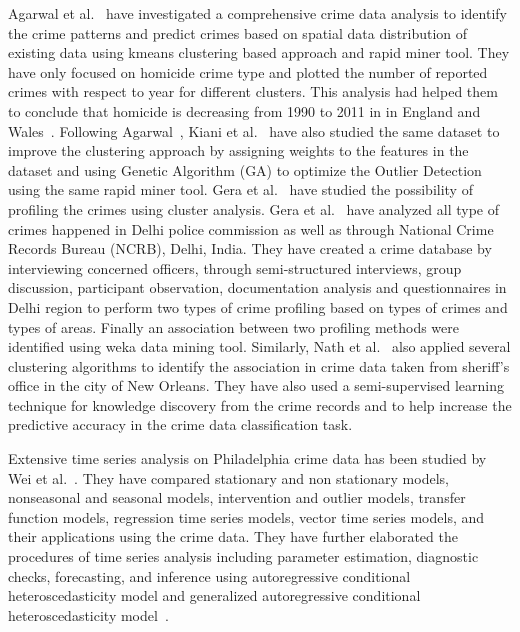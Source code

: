 Agarwal et al.~\cite{hid-sp18-409-agarwal2013crime} have investigated
a comprehensive crime data analysis to identify the crime patterns and
predict crimes based on spatial data distribution of existing data
using kmeans clustering based approach and rapid miner tool. They have
only focused on homicide crime type and plotted the number of reported
crimes with respect to year for different clusters. This analysis had
helped them to conclude that homicide is decreasing from 1990 to 2011
in in England and Wales~\cite{hid-sp18-409-agarwal2013crime}.
Following Agarwal~\cite{hid-sp18-409-agarwal2013crime}, Kiani et
al.~\cite{hid-sp18-409-kiani2015analysis} have also studied the same
dataset to improve the clustering approach by assigning weights to the
features in the dataset and using Genetic Algorithm (GA) to optimize
the Outlier Detection using the same rapid miner tool. Gera et
al.~\cite{hid-sp18-409-gera2014city} have studied the possibility of
profiling the crimes using cluster analysis. Gera et
al.~\cite{hid-sp18-409-gera2014city} have analyzed all type of crimes
happened in Delhi police commission as well as through National Crime
Records Bureau (NCRB), Delhi, India. They have created a crime
database by interviewing concerned officers, through semi-structured
interviews, group discussion, participant observation, documentation
analysis and questionnaires in Delhi region to perform two types of
crime profiling based on types of crimes and types of areas. Finally
an association between two profiling methods were identified using
weka data mining tool. Similarly, Nath et
al.~\cite{hid-sp18-409-nath2006crime} also applied several clustering
algorithms to identify the association in crime data taken from
sheriff’s office in the city of New Orleans. They have also used a
semi-supervised learning technique for knowledge discovery from the
crime records and to help increase the predictive accuracy in the
crime data classification task.

Extensive time series analysis on Philadelphia crime data has been
studied by Wei et al.~\cite{hid-sp18-409-wei2006time}. They have
compared stationary and non stationary models, nonseasonal and
seasonal models, intervention and outlier models, transfer function
models, regression time series models, vector time series models, and
their applications using the crime data. They have further elaborated
the procedures of time series analysis including parameter estimation,
diagnostic checks, forecasting, and inference using autoregressive
conditional heteroscedasticity model and generalized autoregressive
conditional heteroscedasticity model~\cite{hid-sp18-409-wei2006time}.

